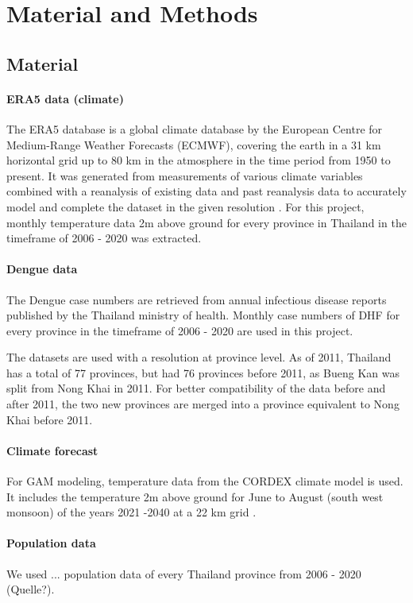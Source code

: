 \section{Material and Methods}

\subsection{Material}

	\paragraph{ERA5 data (climate)}
	The ERA5 database is a global climate database by the European Centre for Medium-Range Weather Forecasts (ECMWF), covering the earth in a 31 km horizontal grid up to 80 km in the atmosphere in the time period from 1950 to present. It was generated from measurements of various climate variables combined with a reanalysis of existing data and past reanalysis data to accurately model and complete the dataset in the given resolution \citep{Hersbach2020}. For this project, monthly temperature data 2m above ground for every province in Thailand in the timeframe of 2006 - 2020 was extracted.
	\paragraph{Dengue data}
	The Dengue case numbers are retrieved from annual infectious disease reports published by the Thailand ministry of health. Monthly case numbers of DHF for every province in the timeframe of 2006 - 2020 are used in this project. 
	
	The datasets are used with a resolution at province level. As of 2011, Thailand has a total of 77 provinces, but had 76 provinces before 2011, as Bueng Kan was split from Nong Khai in 2011. For better compatibility of the data before and after 2011, the two new provinces are merged into a province equivalent to Nong Khai before 2011. 
	
	\paragraph{Climate forecast}
	For GAM modeling, temperature  data from the CORDEX climate model is used. It includes the temperature 2m above ground for June to August (south west monsoon) of the years 2021 -2040 at a 22 km grid \citep{Copernicus2019}. 
	\paragraph{Population data}
	We used ... population data of every Thailand province from 2006 - 2020 (Quelle?).
	
